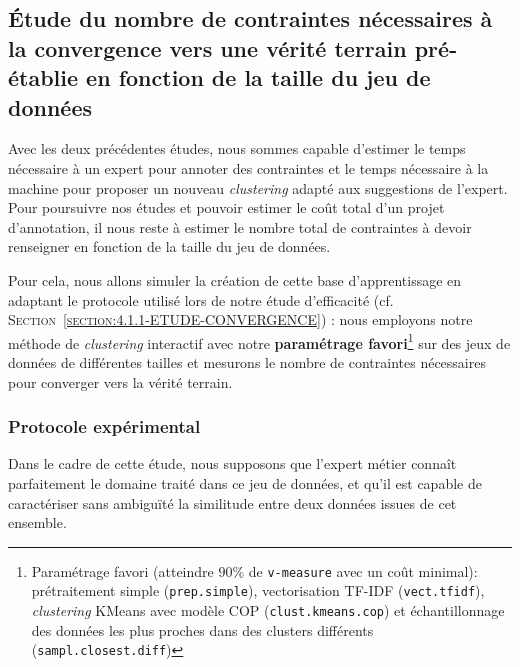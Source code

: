 	\subsection{Étude du nombre de contraintes nécessaires à la convergence vers une vérité terrain pré-établie en fonction de la taille du jeu de données}
	\label{section:4.3.3-ETUDE-COUT-NOMBRE-CONTRAINTES}
			
		Avec les deux précédentes études, nous sommes capable d'estimer le temps nécessaire à un expert pour annoter des contraintes et le temps nécessaire à la machine pour proposer un nouveau \textit{clustering} adapté aux suggestions de l'expert.
		Pour poursuivre nos études et pouvoir estimer le coût total d'un projet d'annotation, il nous reste à estimer le nombre total de contraintes à devoir renseigner en fonction de la taille du jeu de données.
		
		Pour cela, nous allons simuler la création de cette base d'apprentissage en adaptant le protocole utilisé lors de notre étude d'efficacité (cf. \textsc{Section~\ref{section:4.1.1-ETUDE-CONVERGENCE}}) :
		nous employons notre méthode de \textit{clustering} interactif avec notre \textbf{paramétrage favori}\footnote{
			Paramétrage favori (atteindre $90$\% de \texttt{v-measure} avec un coût minimal): prétraitement simple (\texttt{prep.simple}), vectorisation TF-IDF (\texttt{vect.tfidf}), \textit{clustering} KMeans avec modèle COP (\texttt{clust.kmeans.cop}) et échantillonnage des données les plus proches dans des clusters différents (\texttt{sampl.closest.diff})
		}
		sur des jeux de données de différentes tailles et mesurons le nombre de contraintes nécessaires pour converger vers la vérité terrain.
	
		\subsubsection{Protocole expérimental}
			
			\begin{leftBarWarning}
				Dans le cadre de cette étude, nous supposons que l'expert métier connaît parfaitement le domaine traité dans ce jeu de données, et qu'il est capable de caractériser sans ambiguïté la similitude entre deux données issues de cet ensemble.
			\end{leftBarWarning}
			
